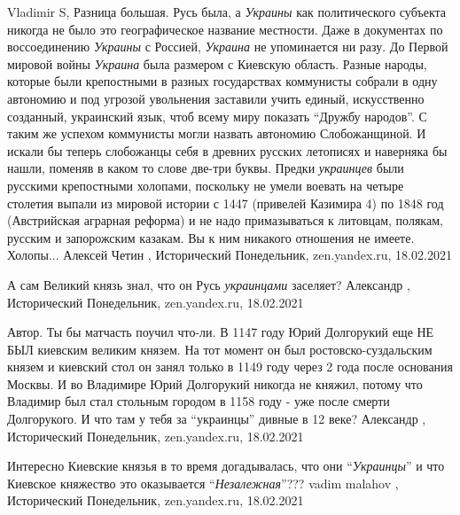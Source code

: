 Vladimir S, Разница большая. Русь была, а \emph{Украины} как политического субъекта
никогда не было это географическое название местности. Даже в документах по
воссоединению \emph{Украины} с Россией, \emph{Украина} не упоминается ни разу. До Первой
мировой войны \emph{Украина} была размером с Киевскую область. Разные народы, которые
были крепостными в разных государствах коммунисты собрали в одну автономию и
под угрозой увольнения заставили учить единый, искусственно созданный,
украинский язык, чтоб всему миру показать \enquote{Дружбу народов}. С таким же успехом
коммунисты могли назвать автономию Слобожанщиной. И искали бы теперь слобожанцы
себя в древних русских летописях и наверняка бы нашли, поменяв в каком то слове
две-три буквы. Предки \emph{украинцев} были русскими крепостными холопами, поскольку
не умели воевать на четыре столетия выпали из мировой истории с 1447 (привелей
Казимира 4) по 1848 год (Австрийская аграрная реформа) и не надо примазываться
к литовцам, полякам, русским и запорожским казакам. Вы к ним никакого отношения
не имеете. Холопы...
Алексей Четин
, 
Исторический Понедельник, zen.yandex.ru, 18.02.2021

А сам Великий князь знал, что он Русь \emph{украинцами} заселяет?
Александр
, 
Исторический Понедельник, zen.yandex.ru, 18.02.2021

Автор. Ты бы матчасть поучил что-ли. В 1147 году Юрий Долгорукий еще НЕ БЫЛ
киевским великим князем. На тот момент он был ростовско-суздальским князем и
киевский стол он занял только в 1149 году через 2 года после основания Москвы.
И во Владимире Юрий Долгорукий никогда не княжил, потому что Владимир был стал
стольным городом в 1158 году - уже после смерти Долгорукого. И что там у тебя
за \enquote{украинцы} дивные в 12 веке?
Александр
, 
Исторический Понедельник, zen.yandex.ru, 18.02.2021

Интересно Киевские князья в то время догадывалась, что они \enquote{\emph{Украинцы}} и что
Киевское княжество это оказывается \enquote{\emph{Незалежная}}??? 
vadim malahov
, 
Исторический Понедельник, zen.yandex.ru, 18.02.2021

